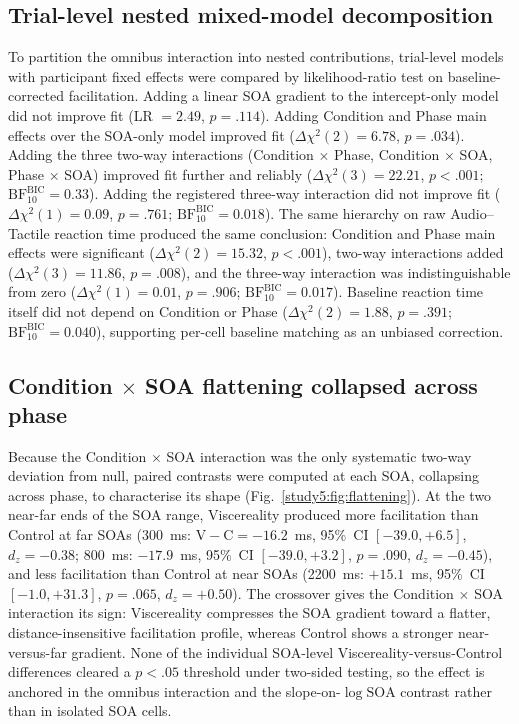 \subsection{Trial-level nested mixed-model decomposition}

To partition the omnibus interaction into nested contributions, trial-level models with participant fixed effects were compared by likelihood-ratio test on baseline-corrected facilitation. Adding a linear SOA gradient to the intercept-only model did not improve fit (LR $= 2.49$, $p = .114$). Adding Condition and Phase main effects over the SOA-only model improved fit ($\Delta\chi^{2}(2) = 6.78$, $p = .034$). Adding the three two-way interactions (Condition $\times$ Phase, Condition $\times$ SOA, Phase $\times$ SOA) improved fit further and reliably ($\Delta\chi^{2}(3) = 22.21$, $p < .001$; $\mathrm{BF}_{10}^{\mathrm{BIC}} = 0.33$). Adding the registered three-way interaction did not improve fit ($\Delta\chi^{2}(1) = 0.09$, $p = .761$; $\mathrm{BF}_{10}^{\mathrm{BIC}} = 0.018$). The same hierarchy on raw Audio--Tactile reaction time produced the same conclusion: Condition and Phase main effects were significant ($\Delta\chi^{2}(2) = 15.32$, $p < .001$), two-way interactions added ($\Delta\chi^{2}(3) = 11.86$, $p = .008$), and the three-way interaction was indistinguishable from zero ($\Delta\chi^{2}(1) = 0.01$, $p = .906$; $\mathrm{BF}_{10}^{\mathrm{BIC}} = 0.017$). Baseline reaction time itself did not depend on Condition or Phase ($\Delta\chi^{2}(2) = 1.88$, $p = .391$; $\mathrm{BF}_{10}^{\mathrm{BIC}} = 0.040$), supporting per-cell baseline matching as an unbiased correction.

\subsection[Condition x SOA flattening collapsed across phase]{Condition $\times$ SOA flattening collapsed across phase}

Because the Condition $\times$ SOA interaction was the only systematic two-way deviation from null, paired contrasts were computed at each SOA, collapsing across phase, to characterise its shape (Fig.~\ref{study5:fig:flattening}). At the two near-far ends of the SOA range, Viscereality produced more facilitation than Control at far SOAs (300~ms: $\mathrm{V}-\mathrm{C} = -16.2$~ms, 95\%~CI $[-39.0, +6.5]$, $d_{z} = -0.38$; 800~ms: $-17.9$~ms, 95\%~CI $[-39.0, +3.2]$, $p = .090$, $d_{z} = -0.45$), and less facilitation than Control at near SOAs (2200~ms: $+15.1$~ms, 95\%~CI $[-1.0, +31.3]$, $p = .065$, $d_{z} = +0.50$). The crossover gives the Condition $\times$ SOA interaction its sign: Viscereality compresses the SOA gradient toward a flatter, distance-insensitive facilitation profile, whereas Control shows a stronger near-versus-far gradient. None of the individual SOA-level Viscereality-versus-Control differences cleared a $p < .05$ threshold under two-sided testing, so the effect is anchored in the omnibus interaction and the slope-on-$\log\mathrm{SOA}$ contrast rather than in isolated SOA cells.

